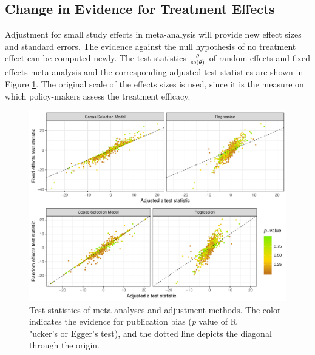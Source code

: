 \documentclass[11pt,a4paper,twoside]{book}\usepackage[]{graphicx}\usepackage[]{color}
\newenvironment{knitrout}{}{} %
\begin{document}
\subsection{Change in Evidence for Treatment Effects} \label{sec:change.evidence}
Adjustment for small study effects in meta-analysis will provide new effect sizes and standard errors. The evidence against the null hypothesis of no treatment effect can be computed newly. The test statistics $\frac{\theta}{\operatorname{se}(\theta)}$ of random effects and fixed effects meta-analysis and the corresponding adjusted test statistics are shown in Figure \ref{fig:evidence.adjustment}. The original scale of the effects sizes is used, since it is the measure on which policy-makers assess the treatment efficacy.

\begin{figure}
\begin{knitrout}
\color{fgcolor}

{\centering \includegraphics[width=\textwidth-3cm]{figure/ch03_figunnamed-chunk-26-1} 

}



\end{knitrout}
\caption{Test statistics of meta-analyses and adjustment methods. The color indicates the evidence for publication bias (\textit{p} value of R\\"ucker's or Egger's test), and the dotted line depicts the diagonal through the origin.}
\label{fig:evidence.adjustment}
\end{figure}
\end{document}
